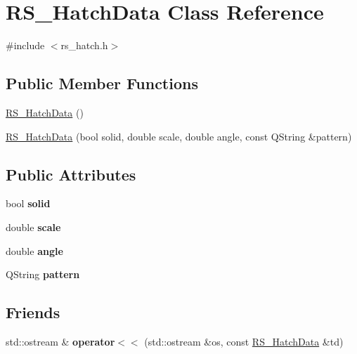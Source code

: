 \hypertarget{classRS__HatchData}{\section{R\-S\-\_\-\-Hatch\-Data Class Reference}
\label{classRS__HatchData}
}


{\ttfamily \#include $<$rs\-\_\-hatch.\-h$>$}

\subsection*{Public Member Functions}
\begin{DoxyCompactItemize}
\item 
\hyperlink{classRS__HatchData_a8752a52fcecc96f9ef1b1a821868eda1}{R\-S\-\_\-\-Hatch\-Data} ()
\item 
\hyperlink{classRS__HatchData_a0025f4a38df93cff6af0254351087ca5}{R\-S\-\_\-\-Hatch\-Data} (bool solid, double scale, double angle, const Q\-String \&pattern)
\end{DoxyCompactItemize}
\subsection*{Public Attributes}
\begin{DoxyCompactItemize}
\item 
\hypertarget{classRS__HatchData_a50f4b2d1c521557e4c560a5f08763af0}{bool {\bfseries solid}}\label{classRS__HatchData_a50f4b2d1c521557e4c560a5f08763af0}

\item 
\hypertarget{classRS__HatchData_abb24a355ff55993c2f8543f6be14ae14}{double {\bfseries scale}}\label{classRS__HatchData_abb24a355ff55993c2f8543f6be14ae14}

\item 
\hypertarget{classRS__HatchData_a67b410b89bc6352331d23319decd9d58}{double {\bfseries angle}}\label{classRS__HatchData_a67b410b89bc6352331d23319decd9d58}

\item 
\hypertarget{classRS__HatchData_ab383e2c9eebf1878d164312dc67c4ced}{Q\-String {\bfseries pattern}}\label{classRS__HatchData_ab383e2c9eebf1878d164312dc67c4ced}

\end{DoxyCompactItemize}
\subsection*{Friends}
\begin{DoxyCompactItemize}
\item 
\hypertarget{classRS__HatchData_a0906a2997c1752d7301a02d5424bacc9}{std\-::ostream \& {\bfseries operator$<$$<$} (std\-::ostream \&os, const \hyperlink{classRS__HatchData}{R\-S\-\_\-\-Hatch\-Data} \&td)}\label{classRS__HatchData_a0906a2997c1752d7301a02d5424bacc9}

\end{DoxyCompactItemize}


